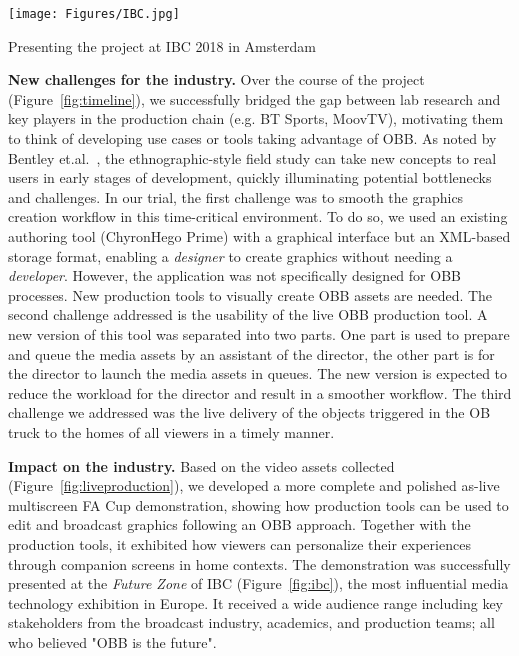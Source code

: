 \documentclass[sigchi-a, authorversion]{acmart}
\begin{document}
\begin{marginfigure}
    \hspace*{-1cm}
    \texttt{[image: Figures/IBC.jpg]}
    \caption{Presenting the project at IBC 2018 in Amsterdam}
    \label{fig:ibc}
\end{marginfigure}

\textbf{New challenges for the industry.} Over the course of the project (Figure~\ref{fig:timeline}), we successfully bridged the gap between lab research 
and key players in the production chain (e.g. BT Sports, MoovTV),
motivating them to think of developing use cases or tools taking advantage of OBB.
As noted by Bentley et.al.~\cite{bentley2009},
the ethnographic-style field study can take new concepts to real users in
early stages of development, quickly illuminating potential
bottlenecks and challenges. In our trial, the first challenge was to smooth the
graphics creation workflow in this time-critical environment. To
do so, we used an existing authoring tool (ChyronHego Prime) with a graphical
interface but an XML-based storage format, enabling a \textit{designer} to create
graphics without needing a \textit{developer}. However, the application was not
specifically designed for OBB processes. New production tools to visually create OBB assets are needed. The second challenge addressed is the usability of the live OBB production tool. A new version of this tool was separated into two parts. One part is used to prepare and queue the media assets by an assistant of the director, the other part is for the director to launch the media assets in queues. The new version is expected to reduce the workload for the director and result in a smoother workflow. The third challenge we addressed was the live delivery of the objects triggered in the OB truck to the homes of all viewers in a timely manner.

\vspace{5pt}\noindent\textbf{Impact on the industry.} Based on the video assets
collected (Figure~\ref{fig:liveproduction}), we developed a more complete and
polished as-live multiscreen FA Cup demonstration, showing how production
tools can be used to edit and broadcast graphics following an OBB approach. Together with
the production tools, it exhibited how viewers can personalize their experiences
through companion screens in home contexts. The
demonstration was successfully presented at the \emph{Future Zone} of IBC
(Figure~\ref{fig:ibc}), the most influential media technology exhibition in
Europe. It received a wide audience range including key stakeholders from the
broadcast industry, academics, and production teams; all who believed "OBB is the future".
\end{document}
